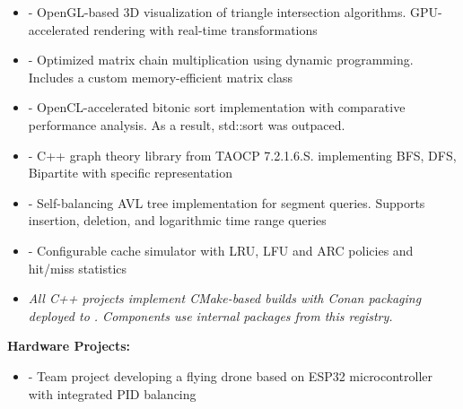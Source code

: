 \documentclass[a4paper,10pt]{article}
\begin{document}
\begin{adjustbox}{valign=t}
\begin{minipage}[t]{0.6\textwidth}
\begin{itemize}
\item {} - OpenGL-based 3D visualization of triangle intersection algorithms. GPU-accelerated rendering with real-time transformations

\item {} - Optimized matrix chain multiplication using dynamic programming. Includes a custom memory-efficient matrix class

\item {} - OpenCL-accelerated bitonic sort implementation with comparative performance analysis. As a result, std::sort was outpaced.

\item {} - C++ graph theory library from TAOCP 7.2.1.6.S. implementing BFS, DFS, Bipartite with specific representation

\item {} - Self-balancing AVL tree implementation for segment queries. Supports insertion, deletion, and logarithmic time range queries

\item {} - Configurable cache simulator with LRU, LFU and ARC policies and hit/miss statistics

\item[] \small{\textit{All C++ projects implement CMake-based builds with Conan packaging deployed to . Components use internal packages from this registry.}}
\end{itemize}

\textbf{Hardware Projects:}
\begin{itemize}
\item {} - Team project developing a flying drone based on ESP32 microcontroller with integrated PID balancing
\end{itemize}

\end{minipage}
\end{adjustbox}
\end{document}
